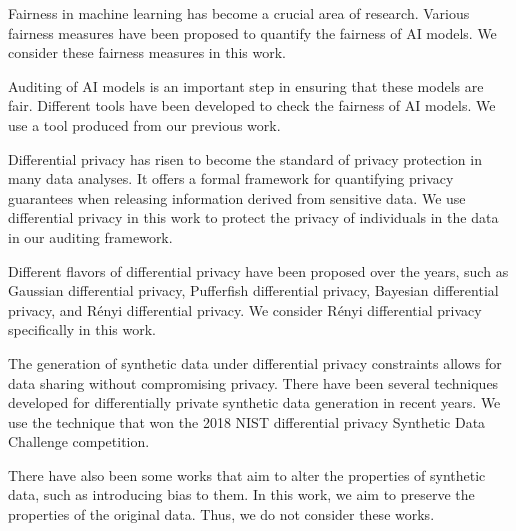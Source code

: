 \documentclass[manuscript,screen,review,anonymous]{acmart}
\begin{document}

Fairness in machine learning has become a crucial area of research\cite{barocas2023fairness}. Various fairness measures have been proposed to quantify\cite{yeh2024analyzing} the fairness of AI models\cite{pessach2022review,corbett2017algorithmic,vzliobaite2017measuring,hardt2016equality,corbett2017algorithmic,berk2021fairness,chouldechova2017fair,kleinberg2016inherent}. We consider these fairness measures in this work.

Auditing of AI models is an important step in ensuring that these models are fair\cite{ferrara2023fairness}. Different tools have been developed to check the fairness of AI models\cite{saleiro2018aequitas,bellamy2019ai,bird2020fairlearn}. We use a tool produced from our previous work\cite{yuan2024ensuring}.


Differential privacy has risen to become the standard of privacy protection in many data analyses\cite{jiang2021applications}. It offers a formal framework for quantifying privacy guarantees when releasing information derived from sensitive data\cite{dwork2006calibrating,dwork2014algorithmic}. We use differential privacy in this work to protect the privacy of individuals in the data in our auditing framework.

Different flavors of differential privacy have been proposed over the years\cite{desfontaines2019sok}, such as Gaussian differential privacy\cite{dong2022gaussian}, Pufferfish differential privacy\cite{kifer2012rigorous}, Bayesian differential privacy\cite{triastcyn2020bayesian}, and R\'enyi differential privacy\cite{mironov2017renyi}. We consider R\'enyi differential privacy specifically in this work.


The generation of synthetic data\cite{raghunathan2021synthetic,lu2023machine} under differential privacy constraints allows for data sharing without compromising privacy\cite{tao2021benchmarking}. There have been several techniques developed for differentially private synthetic data generation\cite{rosenblatt2020differentially,fan2020relational,bowen2019comparative,bowen2020comparative,arnold2020really,xu2019modeling} in recent years. We use the technique that won the 2018 NIST differential privacy Synthetic Data Challenge competition\cite{mckenna2021winning}.

There have also been some works that aim to alter the properties of synthetic data, such as introducing bias to them\cite{jiang2024synthetic,baumann2023bias}. In this work, we aim to preserve the properties of the original data. Thus, we do not consider these works.
\end{document}
